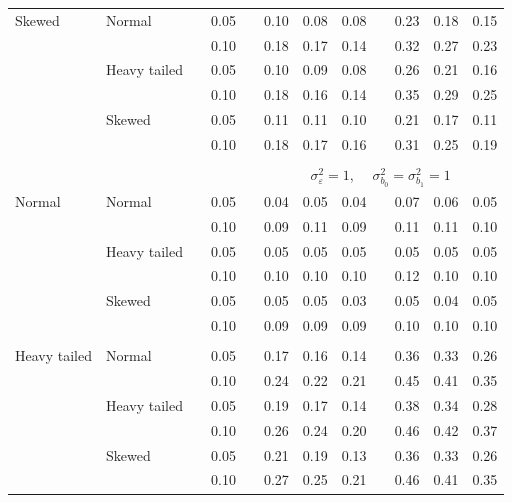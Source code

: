 \documentclass[12pt]{article} %
\begin{document}
\begin{table}[ht]
\begin{scriptsize}
\begin{center}
\begin{tabular}{ll p{.1cm} c p{.1cm} rrr p{.1cm} rrr}
Skewed       & Normal       && 0.05 &&   0.10 & 0.08 & 0.08 && 0.23 & 0.18 & 0.15 \\ 
             &              && 0.10 &&   0.18 & 0.17 & 0.14 && 0.32 & 0.27 & 0.23 \\ 
             & Heavy tailed && 0.05 &&   0.10 & 0.09 & 0.08 && 0.26 & 0.21 & 0.16 \\ 
             &              && 0.10 &&   0.18 & 0.16 & 0.14 && 0.35 & 0.29 & 0.25 \\ 
             & Skewed       && 0.05 &&   0.11 & 0.11 & 0.10 && 0.21 & 0.17 & 0.11 \\ 
             &              && 0.10 &&   0.18 & 0.17 & 0.16 && 0.31 & 0.25 & 0.19 \\ 

&&&&&&&&&&&\\
& && && \multicolumn{7}{c}{$\sigma_{\varepsilon}^2 = 1$, \ \ $\sigma_{b_0}^2 = \sigma_{b_1}^2 = 1$} \\ \cline{6-12}
\rowcolor{gray!20}Normal       & Normal       && 0.05 &&   0.04 & 0.05 & 0.04 && 0.07 & 0.06 & 0.05 \\ 
\rowcolor{gray!20}             &              && 0.10 &&   0.09 & 0.11 & 0.09 && 0.11 & 0.11 & 0.10 \\ 
\rowcolor{gray!20}             & Heavy tailed && 0.05 &&   0.05 & 0.05 & 0.05 && 0.05 & 0.05 & 0.05 \\ 
\rowcolor{gray!20}             &              && 0.10 &&   0.10 & 0.10 & 0.10 && 0.12 & 0.10 & 0.10 \\ 
\rowcolor{gray!20}             & Skewed       && 0.05 &&   0.05 & 0.05 & 0.03 && 0.05 & 0.04 & 0.05 \\ 
\rowcolor{gray!20}             &              && 0.10 &&   0.09 & 0.09 & 0.09 && 0.10 & 0.10 & 0.10 \\ 
             &&&&&&&&&&&\\
Heavy tailed & Normal       && 0.05 &&   0.17 & 0.16 & 0.14 && 0.36 & 0.33 & 0.26 \\ 
             &              && 0.10 &&   0.24 & 0.22 & 0.21 && 0.45 & 0.41 & 0.35 \\ 
             & Heavy tailed && 0.05 &&   0.19 & 0.17 & 0.14 && 0.38 & 0.34 & 0.28 \\ 
             &              && 0.10 &&   0.26 & 0.24 & 0.20 && 0.46 & 0.42 & 0.37 \\ 
             & Skewed       && 0.05 &&   0.21 & 0.19 & 0.13 && 0.36 & 0.33 & 0.26 \\ 
             &              && 0.10 &&   0.27 & 0.25 & 0.21 && 0.46 & 0.41 & 0.35 \\ 

\end{tabular}
\end{center}
\end{scriptsize}
\end{table}
\end{document}
